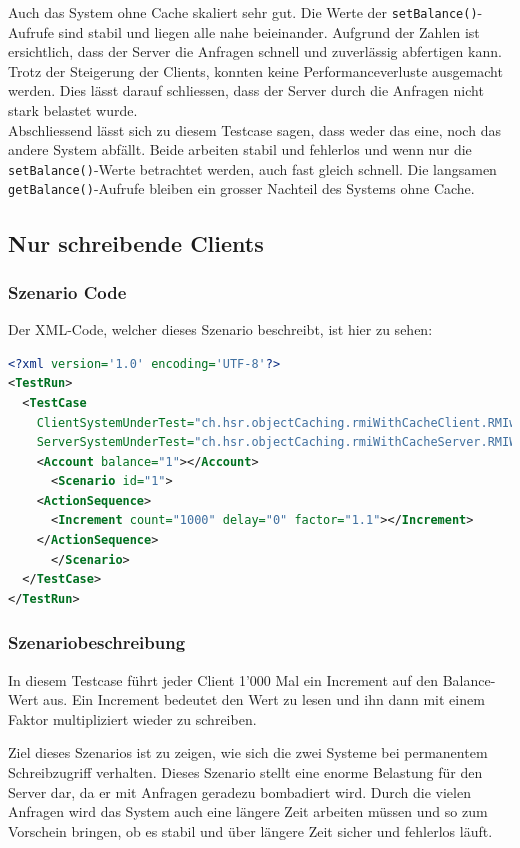 Auch das System ohne Cache skaliert sehr gut. Die Werte der \texttt{set\-Balance()}-Aufrufe sind stabil und liegen alle nahe beieinander. Aufgrund der Zahlen ist ersichtlich, dass der Server die Anfragen schnell und zuverlässig abfertigen kann. Trotz der Steigerung der Clients, konnten keine Performanceverluste ausgemacht werden. Dies lässt darauf schliessen, dass der Server durch die Anfragen nicht stark belastet wurde.\\

Abschliessend lässt sich zu diesem Testcase sagen, dass weder das eine, noch das andere System abfällt. Beide arbeiten stabil und fehlerlos und wenn nur die \texttt{setBalance()}-Werte betrachtet werden, auch fast gleich schnell. Die langsamen \texttt{getBalance()}-Aufrufe bleiben ein grosser Nachteil des Systems ohne Cache. 

\subsection{Nur schreibende Clients}
\subsubsection{Szenario Code}
Der XML-Code, welcher dieses Szenario beschreibt, ist hier zu sehen:
\begin{lstlisting}[language=XML, breaklines=true]
<?xml version='1.0' encoding='UTF-8'?>
<TestRun>
  <TestCase
    ClientSystemUnderTest="ch.hsr.objectCaching.rmiWithCacheClient.RMIwithCacheClientSystem"
    ServerSystemUnderTest="ch.hsr.objectCaching.rmiWithCacheServer.RMIWithCacheServerSystem">
    <Account balance="1"></Account>
      <Scenario id="1">
	<ActionSequence>
	  <Increment count="1000" delay="0" factor="1.1"></Increment>
	</ActionSequence>
      </Scenario>
  </TestCase>
</TestRun>
\end{lstlisting}
\subsubsection{Szenariobeschreibung}
In diesem Testcase führt jeder Client 1'000 Mal ein Increment auf den Balance-Wert aus. Ein Increment bedeutet den Wert zu lesen und ihn dann mit einem Faktor multipliziert wieder zu schreiben. 

Ziel dieses Szenarios ist zu zeigen, wie sich die zwei Systeme bei permanentem Schreibzugriff verhalten. Dieses Szenario stellt eine enorme Belastung für den Server dar, da er mit Anfragen geradezu bombadiert wird. Durch die vielen Anfragen wird das System auch eine längere Zeit arbeiten müssen und so zum Vorschein bringen, ob es stabil und über längere Zeit sicher und fehlerlos läuft. 

